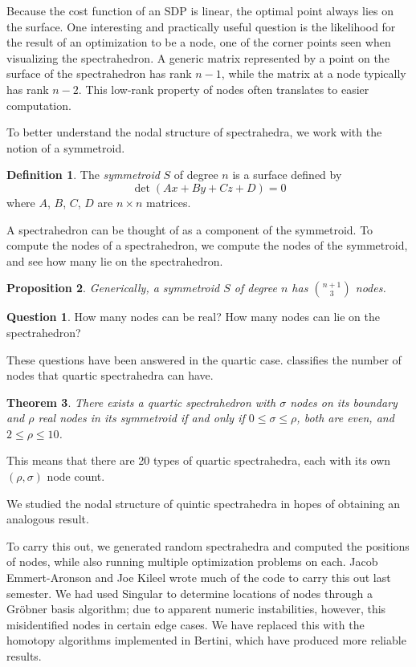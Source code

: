 \documentclass[12pt]{amsart}
\theoremstyle{plain}
\newtheorem{theorem}{Theorem}
\newtheorem{proposition}[theorem]{Proposition}
\theoremstyle{definition}
\newtheorem{definition}[theorem]{Definition}
\newtheorem*{question}{Question}
\begin{document}
Because the cost function of an SDP is linear, the optimal point
always lies on the surface.  One interesting and practically useful
question is the likelihood for the result of an optimization to be a
node, one of the corner points seen when visualizing the
spectrahedron.  A generic matrix represented by a point on the surface
of the spectrahedron has rank $n-1$, while the matrix at a node
typically has rank $n-2$.  This low-rank property of nodes often
translates to easier computation.

To better understand the nodal structure of spectrahedra, we work with the
notion of a symmetroid.
\begin{definition} 
	The \emph{symmetroid} $S$ of degree $n$ is a surface defined by 
	\[ 
		\det (Ax + By + Cz + D) = 0
	\] 
	where $A$, $B$, $C$, $D$ are $n\times n$ matrices.
\end{definition} 
A spectrahedron can be thought of as a component of the symmetroid.
To compute the nodes of a spectrahedron, we compute the nodes of the
symmetroid, and see how many lie on the spectrahedron.

\begin{proposition} 
	Generically, a symmetroid $S$ of degree $n$ has $\binom{n+1}3$ nodes.
\end{proposition} 

\begin{question} 
How many nodes can be real? How many nodes can lie on the spectrahedron?
\end{question} 

These questions have been answered in the quartic case. 
\cite{OKSV} classifies the number of nodes that quartic spectrahedra can have. 
\begin{theorem}\label{quartic}
	There exists a quartic spectrahedron with $\sigma$ nodes on its boundary and
	$\rho$ real nodes in its symmetroid if and only if $0 \le \sigma \le \rho$,
	both are even, and $2 \le \rho \le 10$.
\end{theorem} 
This means that there are 20 types of quartic spectrahedra, each with its own
$(\rho, \sigma)$ node count. 

We studied the nodal structure of quintic spectrahedra in hopes of obtaining an
analogous result.

To carry this out, we generated random spectrahedra and computed
the positions of nodes, while also running multiple optimization
problems on each.  Jacob Emmert-Aronson and Joe Kileel wrote much of
the code to carry this out last semester.  
We had used Singular
to determine locations of nodes through a Gr\"obner basis algorithm;
due to apparent numeric instabilities, however, this misidentified
nodes in certain edge cases.  We have replaced this with the
homotopy algorithms implemented in Bertini, which have produced more
reliable results.  
\end{document}
